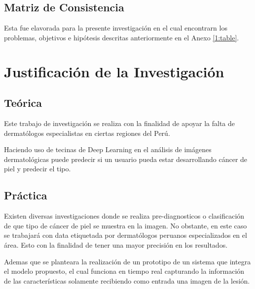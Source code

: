 \subsection{Matriz de Consistencia}

Esta fue elavorada para la presente investigación en el cual encontrarn los problemas, objetivos e hipótesis descritas anteriormente en el Anexo \ref{1:table}.





\section{Justificación de la Investigación}

\subsection{Teórica}
Este trabajo de investigación se realiza con la finalidad de apoyar la falta de dermatólogos especialistas en ciertas regiones del Perú.

Haciendo uso de tecinas de Deep Learning en el análisis de imágenes dermatológicas puede predecir si un usuario pueda estar desarrollando cáncer de piel y predecir el tipo. 


\subsection{Práctica}
Existen diversas investigaciones donde se realiza pre-diagnosticos o clasificación de que tipo de cáncer de piel se muestra en la imagen. No obstante, en este caso se trabajará con data etiquetada por dermatólogos peruanos especializados en el área. Esto con la finalidad de tener una mayor precisión en los resultados.

Ademas que se planteara la realización de un prototipo de un sistema que integra el modelo propuesto, el cual funciona en tiempo real capturando la información de las características solamente recibiendo como entrada una imagen de la lesión. 


